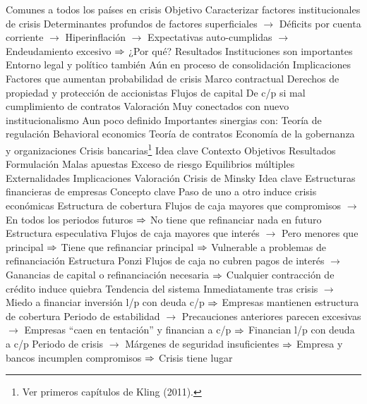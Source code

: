 \documentclass{nuevotema}
\begin{document}
\begin{esquemal}
				\4[] Comunes a todos los países en crisis
				\4 Objetivo
				\4[] Caracterizar factores institucionales de crisis
				\4[] Determinantes profundos de factores superficiales
				\4[] $\to$ Déficits por cuenta corriente
				\4[] $\to$ Hiperinflación
				\4[] $\to$ Expectativas auto-cumplidas
				\4[] $\to$ Endeudamiento excesivo
				\4[] $\Rightarrow$ ¿Por qué?
				\4 Resultados
				\4[] Instituciones son importantes
				\4[] Entorno legal y político también
				\4[] Aún en proceso de consolidación
			\3 Implicaciones
				\4 Factores que aumentan probabilidad de crisis
				\4[] Marco contractual
				\4[] Derechos de propiedad y protección de accionistas
				\4 Flujos de capital
				\4[] De c/p si mal cumplimiento de contratos
			\3 Valoración
				\4 Muy conectados con nuevo institucionalismo
				\4 Aun poco definido
				\4 Importantes sinergias con:
				\4[] Teoría de regulación
				\4[] Behavioral economics
				\4[] Teoría de contratos
				\4[] Economía de la gobernanza y organizaciones
		\2 Crisis bancarias\footnote{Ver primeros capítulos de Kling (2011).}
			\3 Idea clave
				\4 Contexto
				\4 Objetivos
				\4 Resultados
			\3 Formulación
				\4 Malas apuestas
				\4 Exceso de riesgo
				\4 Equilibrios múltiples
				\4 Externalidades
			\3 Implicaciones
			\3 Valoración
		\2 Crisis de Minsky
			\3 Idea clave
				\4 Estructuras financieras de empresas
				\4[] Concepto clave
				\4[] Paso de uno a otro induce crisis económicas
				\4[i] Estructura de cobertura
				\4[] Flujos de caja mayores que compromisos
				\4[] $\to$ En todos los periodos futuros
				\4[] $\Rightarrow$ No tiene que refinanciar nada en futuro
				\4[ii] Estructura especulativa
				\4[] Flujos de caja mayores que interés
				\4[] $\to$ Pero menores que principal
				\4[] $\Rightarrow$ Tiene que refinanciar principal
				\4[] $\Rightarrow$ Vulnerable a problemas de refinanciación
				\4[iii] Estructura Ponzi
				\4[] Flujos de caja no cubren pagos de interés
				\4[] $\to$ Ganancias de capital o refinanciación necesaria
				\4[] $\Rightarrow$ Cualquier contracción de crédito induce quiebra
				\4 Tendencia del sistema
				\4[] Inmediatamente tras crisis
				\4[] $\to$ Miedo a financiar inversión l/p con deuda c/p
				\4[] $\Rightarrow$ Empresas mantienen estructura de cobertura
				\4[] Periodo de estabilidad
				\4[] $\to$ Precauciones anteriores parecen excesivas
				\4[] $\to$ Empresas ``caen en tentación'' y financian a c/p
				\4[] $\Rightarrow$ Financian l/p con deuda a c/p
				\4[] Periodo de crisis
				\4[] $\to$ Márgenes de seguridad insuficientes
				\4[] $\Rightarrow$ Empresa y bancos incumplen compromisos
				\4[] $\Rightarrow$ Crisis tiene lugar

\end{esquemal}
\end{document}
